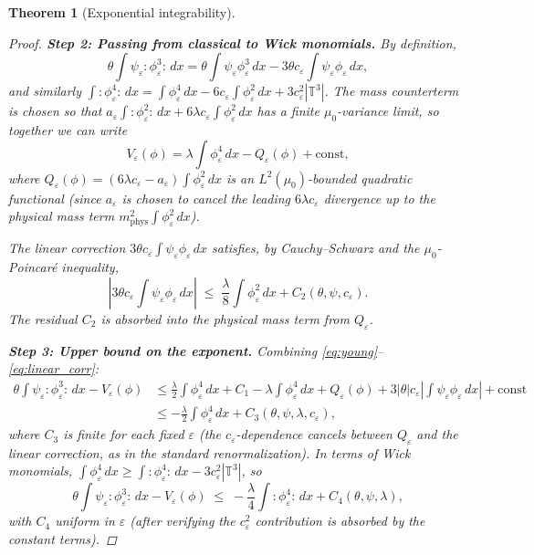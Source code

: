 \documentclass[11pt,a4paper]{article}
\newtheorem{theorem}{Theorem}[section]
\theoremstyle{definition}
\newcommand{\T}{\mathbb{T}}
\newcommand{\wick}[1]{:\!#1\!:}
\begin{document}
\begin{theorem}[Exponential integrability]
\begin{proof}
\medskip
\noindent\textbf{Step 2: Passing from classical to Wick monomials.}
By definition,
\[
\theta\!\int\psi_\varepsilon\wick{\phi_\varepsilon^3}\,dx
= \theta\!\int\psi_\varepsilon\phi_\varepsilon^3\,dx
- 3\theta c_\varepsilon\!\int\psi_\varepsilon\phi_\varepsilon\,dx,
\]
and similarly $\int\wick{\phi_\varepsilon^4}\,dx = \int\phi_\varepsilon^4\,dx - 6c_\varepsilon\int\phi_\varepsilon^2\,dx + 3c_\varepsilon^2|\T^3|$.
The mass counterterm is chosen so that $a_\varepsilon\int\wick{\phi_\varepsilon^2}\,dx + 6\lambda c_\varepsilon\int\phi_\varepsilon^2\,dx$ has a finite $\mu_0$-variance limit, so together we can write
\begin{equation}\label{eq:Veps_expand}
V_\varepsilon(\phi) = \lambda\int\phi_\varepsilon^4\,dx - Q_\varepsilon(\phi) + \text{const},
\end{equation}
where $Q_\varepsilon(\phi) = (6\lambda c_\varepsilon - a_\varepsilon)\int\phi_\varepsilon^2\,dx$ is an $L^2(\mu_0)$-bounded quadratic functional (since $a_\varepsilon$ is chosen to cancel the leading $6\lambda c_\varepsilon$ divergence up to the physical mass term $m_{\mathrm{phys}}^2\int\phi_\varepsilon^2\,dx$).

The linear correction $3\theta c_\varepsilon\int\psi_\varepsilon\phi_\varepsilon\,dx$ satisfies, by Cauchy--Schwarz and the $\mu_0$-Poincar\'{e} inequality,
\begin{equation}\label{eq:linear_corr}
\left|3\theta c_\varepsilon\!\int\psi_\varepsilon\phi_\varepsilon\,dx\right|
\;\le\;
\frac{\lambda}{8}\int\phi_\varepsilon^2\,dx + C_2(\theta,\psi,c_\varepsilon).
\end{equation}
The residual $C_2$ is absorbed into the physical mass term from $Q_\varepsilon$.

\medskip
\noindent\textbf{Step 3: Upper bound on the exponent.}
Combining \eqref{eq:young}--\eqref{eq:linear_corr}:
\begin{align}
\theta\!\int\psi_\varepsilon\wick{\phi_\varepsilon^3}\,dx - V_\varepsilon(\phi)
&\le
\frac{\lambda}{2}\!\int\phi_\varepsilon^4\,dx + C_1
- \lambda\!\int\phi_\varepsilon^4\,dx + Q_\varepsilon(\phi)
+ 3|\theta|c_\varepsilon|\int\psi_\varepsilon\phi_\varepsilon\,dx|
+ \mathrm{const}\nonumber\\
&\le
-\frac{\lambda}{2}\!\int\phi_\varepsilon^4\,dx + C_3(\theta,\psi,\lambda,c_\varepsilon),\label{eq:exponent_ub}
\end{align}
where $C_3$ is finite for each fixed $\varepsilon$ (the $c_\varepsilon$-dependence cancels between $Q_\varepsilon$ and the linear correction, as in the standard renormalization).
In terms of Wick monomials, $\int\phi_\varepsilon^4\,dx \ge \int\wick{\phi_\varepsilon^4}\,dx - 3c_\varepsilon^2|\T^3|$, so
\begin{equation}\label{eq:exponent_wick}
\theta\!\int\psi_\varepsilon\wick{\phi_\varepsilon^3}\,dx - V_\varepsilon(\phi)
\;\le\;
-\frac{\lambda}{4}\!\int\wick{\phi_\varepsilon^4}\,dx + C_4(\theta,\psi,\lambda),
\end{equation}
with $C_4$ uniform in $\varepsilon$ (after verifying the $c_\varepsilon^2$ contribution is absorbed by the constant terms).


\end{proof}
\end{theorem}
\end{document}
